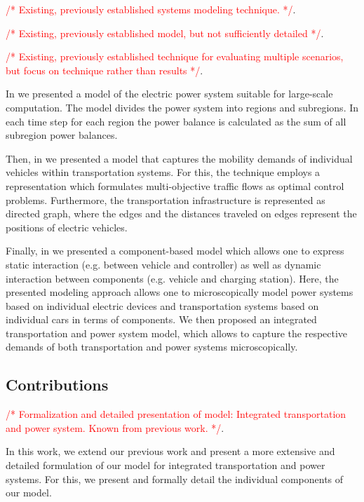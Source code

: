 \documentclass[conference]{IEEEtran}
\newcommand{\todo}[1]{\textcolor{red}{/* #1 */}}
\begin{document}
	 \todo{Existing, previously established systems modeling technique.}. 

 \todo{Existing, previously established model, but not sufficiently detailed}. 

 \todo{Existing, previously established technique for evaluating multiple scenarios, but focus on technique rather than results}. 
 
	In \cite{Hackenberg2012} we presented a model of the electric power system suitable for large-scale computation. The model divides the power system into regions and subregions. In each time step for each region the power balance is calculated as the sum of all subregion power balances.
	
	Then, in \cite{ascher2014early} we presented a model that captures the mobility demands of individual vehicles within transportation systems. For this, the technique employs a representation which formulates multi-objective traffic flows as optimal control problems. Furthermore, the transportation infrastructure is represented as directed graph, where the edges and the distances traveled on edges represent the positions of electric vehicles.
	
	Finally, in \cite{ascher2015integrated} we presented a component-based model which allows one to express static interaction (e.g. between vehicle and controller) as well as dynamic interaction between components (e.g. vehicle and charging station). Here, the presented modeling approach allows one to microscopically model power systems based on individual electric devices and transportation systems based on individual cars in terms of components. We then proposed an integrated transportation and power system model, which allows to capture the respective demands of both transportation and power systems microscopically.
	
	\subsection{Contributions}
	\label{contributions}
	
	\todo{Formalization and detailed presentation of model: Integrated transportation and power system. Known from previous work.}.

	
	In this work, we extend our previous work and present a more extensive and detailed formulation of our model for integrated transportation and power systems. For this, we present and formally detail the individual components of our model.
	
\end{document}
